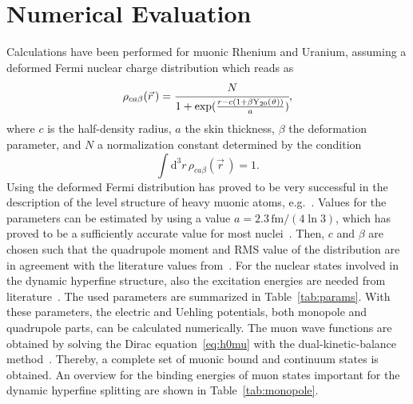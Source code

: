 \section{Numerical Evaluation}
\label{sec:num}
Calculations have been performed for muonic Rhenium and Uranium, assuming a deformed Fermi nuclear charge distribution which reads as
\begin{equation}
\rho_{ca\beta}(\vec{r}\,)=\cfrac{N}{1+\exp (\frac{r-c(1+\beta \text{Y}_{20}(\vartheta))}{a})},
\label{eq:deffermi_2}
\end{equation}
where $c$ is the half-density radius, $a$ the skin thickness, $\beta$ the deformation parameter, and $N$ a normalization constant determined by the condition
\begin{equation}
\int \text{d}^3r\, \rho_{ca\beta}(\vec{r}\,)=1.
\end{equation}
Using the deformed Fermi distribution has proved to be very successful in the description of the level structure of heavy muonic atoms, e.g.~\cite{hitlin1970,tanaka1984,tanaka1984_2}.
Values for the parameters can be estimated by using a value ${a}{=}{2.3\,\text{fm}/(4\ln 3)}$, which has proved to be a sufficiently accurate value for most nuclei~\cite{Beier2000}. Then, $c$ and $\beta$ are chosen such that the quadrupole moment and RMS value of the distribution are in agreement with the literature values from~\cite{Angeli2013,Stone2005}. For the nuclear states involved in the dynamic hyperfine structure, also the excitation energies are needed from literature~\cite{ENSDF}. The used parameters are summarized in Table~\ref{tab:params}.
With these parameters, the electric and Uehling potentials, both monopole and quadrupole parts, can be calculated numerically. The muon wave functions are obtained by solving the Dirac equation~\eqref{eq:h0mu} with the dual-kinetic-balance method~\cite{Shabaev2004}. Thereby, a complete set of muonic bound and continuum states is obtained. An overview for the binding energies of muon states important for the dynamic hyperfine splitting are shown in Table~\ref{tab:monopole}.

